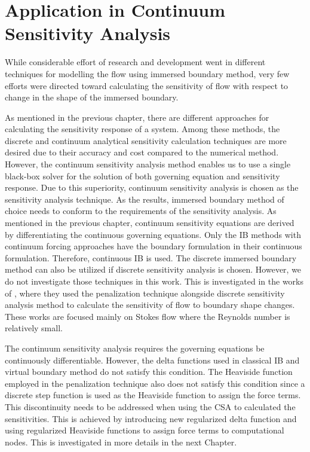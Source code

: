 \section{Application in Continuum Sensitivity Analysis}
While considerable effort of research and development went in different techniques for modelling the flow using immersed boundary method, very few efforts were directed toward calculating the sensitivity of flow with respect to change in the shape of the immersed boundary.

As mentioned in the previous chapter, there are different approaches for calculating the sensitivity response of a system. Among these methods, the discrete and continuum analytical sensitivity calculation techniques are more desired due to their accuracy and cost compared to the numerical method. However, the continuum sensitivity analysis method enables us to use a single black-box solver for the solution of both governing equation and sensitivity response. Due to this superiority, continuum sensitivity analysis is chosen as the sensitivity analysis technique. As the results, immersed boundary method of choice needs to conform to the requirements of the sensitivity analysis. As mentioned in the previous chapter, continuum sensitivity equations are derived by differentiating the continuous governing equations. Only the IB methods with continuum forcing approaches have the boundary formulation in their continuous formulation. Therefore, continuous IB is used. The discrete immersed boundary method can also be utilized if discrete sensitivity analysis is chosen. However, we do not investigate those techniques in this work. This is investigated in the works of \cite{kreissl2011explicit, borrvall2003topology, challis2009level}, where they used the penalization technique alongside discrete sensitivity analysis method to calculate the sensitivity of flow to boundary shape changes. These works are focused mainly on Stokes flow where the Reynolds number is relatively small.

The continuum sensitivity analysis requires the governing equations be continuously differentiable. However, the delta functions used in classical IB and virtual boundary method do not satisfy this condition. The Heaviside function employed in the penalization technique also does not satisfy this condition since a discrete step function is used as the Heaviside function to assign the force terms. This discontinuity needs to be addressed when using the CSA to calculated the sensitivities. This is achieved by introducing new regularized delta function and using regularized Heaviside functions to assign force terms to computational nodes. This is investigated in more details in the next Chapter.


